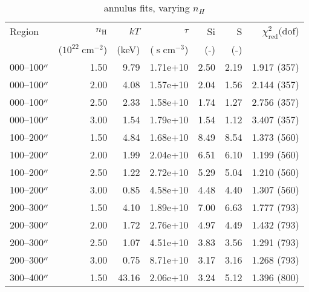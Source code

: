 \documentclass[twocolumn,tighten,trackchanges]{aastex6}
\newcommand*{\mt}{\mathrm}
\newcommand*{\unit}[1]{\;\mt{#1}}  %
\begin{document}
\begin{table*}
    \centering
    \caption{annulus fits, varying $n_H$}
    \begin{tabular}{@{}lrrrrrr@{}}
        \toprule
        Region & $n_\mathrm{H}$             & $kT$  & $\tau$                & Si  & S   & $\chi^2_{\mathrm{red}} (\mathrm{dof}$) \\
               & ($10^{22} \unit{cm^{-2}}$) & (keV) & ($\unit{s\;cm^{-3}}$) & (-) & (-) &  \\
        \midrule
        000--100$\mbox{$^{\prime\prime}$}$ & 1.50 & 9.79 & 1.71e+10 & 2.50 & 2.19 & 1.917 (357) \\  %
        000--100$\mbox{$^{\prime\prime}$}$ & 2.00 & 4.08 & 1.57e+10 & 2.04 & 1.56 & 2.144 (357) \\  %
        000--100$\mbox{$^{\prime\prime}$}$ & 2.50 & 2.33 & 1.58e+10 & 1.74 & 1.27 & 2.756 (357) \\  %
        000--100$\mbox{$^{\prime\prime}$}$ & 3.00 & 1.54 & 1.79e+10 & 1.54 & 1.12 & 3.407 (357) \\  %
        \midrule
        100--200$\mbox{$^{\prime\prime}$}$ & 1.50 & 4.84 & 1.68e+10 & 8.49 & 8.54 & 1.373 (560) \\  %
        100--200$\mbox{$^{\prime\prime}$}$ & 2.00 & 1.99 & 2.04e+10 & 6.51 & 6.10 & 1.199 (560) \\  %
        100--200$\mbox{$^{\prime\prime}$}$ & 2.50 & 1.22 & 2.72e+10 & 5.29 & 5.04 & 1.210 (560) \\  %
        100--200$\mbox{$^{\prime\prime}$}$ & 3.00 & 0.85 & 4.58e+10 & 4.48 & 4.40 & 1.307 (560) \\  %
        \midrule
        200--300$\mbox{$^{\prime\prime}$}$ & 1.50 & 4.10 & 1.89e+10 & 7.00 & 6.63 & 1.777 (793) \\  %
        200--300$\mbox{$^{\prime\prime}$}$ & 2.00 & 1.72 & 2.76e+10 & 4.97 & 4.49 & 1.432 (793) \\  %
        200--300$\mbox{$^{\prime\prime}$}$ & 2.50 & 1.07 & 4.51e+10 & 3.83 & 3.56 & 1.291 (793) \\  %
        200--300$\mbox{$^{\prime\prime}$}$ & 3.00 & 0.75 & 8.71e+10 & 3.17 & 3.16 & 1.268 (793) \\  %
        \midrule
        300--400$\mbox{$^{\prime\prime}$}$ & 1.50 & 43.16 & 2.06e+10 & 3.24 & 5.12 & 1.396 (800) \\  %

\end{tabular}
\end{table*}
\end{document}
